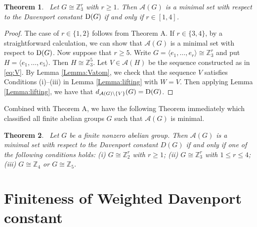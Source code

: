 \documentclass[a4paper, 12pt]{article}
\newtheorem{theorem}{Theorem}[section]
\begin{document}
\begin{theorem}\label{theorem in group exp(G)geq 6} \ Let $G\cong \mathbb{Z}_3^r$ with $r\geq 1$. Then $\mathcal A (G)$ is a minimal set with respect to the Davenport constant ${\rm D}(G)$ if and only if $r\in [1,4]$.
\end{theorem}

\begin{proof} The case of $r\in \{1,2\}$ follows from  Theorem A. If $r\in \{3,4\}$, by a straightforward calculation, we can show that $\mathcal A (G)$ is a minimal set with respect to ${\rm D}(G)$.
Now suppose that $r\geq 5$. Write
$G=\langle e_1,\ldots,e_r\rangle\cong\mathbb Z_3^r$
and put
$H=\langle e_1,\ldots,e_5\rangle.$
Then
$H\cong\mathbb Z_3^5$.
Let $V\in\mathcal A(H)$ be the sequence constructed as in  \eqref{eq:V}.
 By Lemma \ref{Lemma:Vatom}, we check that the sequence $V$ satisfies Conditions (i)--(iii) in Lemma \ref{Lemma:lifting} with $W=V$.  Then applying Lemma \ref{Lemma:lifting}, we have that $d_{\mathcal{A}(G)\setminus \{V\}}(G)={\rm D}(G)$. \end{proof}

 Combined with Theorem A, we have the following Theorem immediately which classified all finite abelian groups $G$ such that $\mathcal A (G)$ is minimal.

\begin{theorem} \label{theorem in group exp(G)geq 6} \
Let $G$ be a finite nonzero abelian group. Then $\mathcal A(G)$ is
a minimal set with respect to the Davenport constant $D(G)$ if and
only if one of the following conditions holds:
(i) $G\cong \mathbb Z_2^r$ with $r\geq 1$;
(ii) $G\cong \mathbb Z_3^r$ with $1\le r\leq 4$;
(iii) $G\cong \mathbb Z_4$ or $G\cong \mathbb Z_5$.
\end{theorem}



\section{Finiteness of Weighted Davenport constant}
\end{document}
